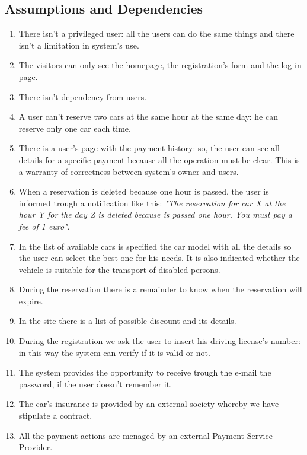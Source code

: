 \subsection{Assumptions and Dependencies} \label{subsec:dependencies}
\begin{enumerate}
\item There isn't a privileged user: all the users can do the same things and there isn't a limitation in system's use.
\item The visitors can only see the homepage, the registration's form and the log in page.
\item There isn't dependency from users.
\item A user can't reserve two cars at the same hour at the same day: he can reserve only one car each time.
\item There is a user's page with the payment history: so, the user can see all details for a specific payment because all the operation must be clear. This is a warranty of correctness between system's owner and users.
\item When a reservation is deleted because one hour is passed, the user is informed trough a notification like this: \emph{"The reservation for car X at the hour Y for the day Z is deleted because is passed one hour. You must pay a fee of 1 euro"}.
\item In the list of available cars is specified the car model with all the details so the user can select the best one for his needs. It is also indicated whether the vehicle is suitable for the transport of disabled persons.
\item During the reservation there is a remainder to know when the reservation will expire.
\item In the site there is a list of possible discount and its details.
\item During the registration we ask the user to insert his driving license's number: in this way the system can verify if it is valid or not.
\item The system provides the opportunity to receive trough the e-mail the password, if the user doesn't remember it.
\item The car's insurance is provided by an external society whereby we have stipulate a contract.
\item All the payment actions are menaged by an external Payment Service Provider.
\end{enumerate}

